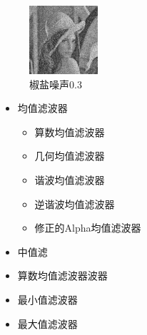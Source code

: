 \documentclass{article}
\begin{document}
\begin{figure}
{\begin{minipage}[t]{0.3\linewidth}
                \centering
                \includegraphics[width=1in]{img/Lena_no_sa&pe_2.png}
                \caption{椒盐噪声0.3}
            \end{minipage}
        }
    \end{figure}\par

    \begin{itemize}
        \item 均值滤波器
        \begin{itemize}
            \item 算数均值滤波器
            \item 几何均值滤波器
            \item 谐波均值滤波器
            \item 逆谐波均值滤波器
            \item 修正的Alpha均值滤波器
        \end{itemize}
        \item 中值滤\item 算数均值滤波器波器
        \item 最小值滤波器
        \item 最大值滤波器
    \end{itemize}\par
\end{document}
